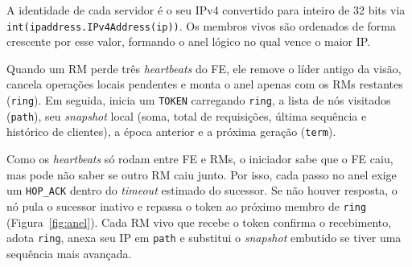 \documentclass[12pt]{article}
\begin{document}
A identidade de cada servidor é o seu IPv4 convertido para inteiro de 32 bits via \texttt{int(ipaddress.\allowbreak IPv4Address(ip))}. Os membros vivos são ordenados de forma crescente por esse valor, formando o anel lógico no qual vence o maior IP.

Quando um RM perde três \textit{heartbeats} do FE, ele remove o líder antigo da visão, cancela operações locais pendentes e monta o anel apenas com os RMs restantes (\texttt{ring}). Em seguida, inicia um \texttt{TOKEN} carregando \texttt{ring}, a lista de nós visitados (\texttt{path}), seu \textit{snapshot} local (soma, total de requisições, última sequência e histórico de clientes), a época anterior e a próxima geração (\texttt{term}).

Como os \textit{heartbeats} só rodam entre FE e RMs, o iniciador sabe que o FE caiu, mas pode não saber se outro RM caiu junto. Por isso, cada passo no anel exige um \texttt{HOP\_ACK} dentro do \textit{timeout} estimado do sucessor. Se não houver resposta, o nó pula o sucessor inativo e repassa o token ao próximo membro de \texttt{ring} (Figura~\ref{fig:anel}). Cada RM vivo que recebe o token confirma o recebimento, adota \texttt{ring}, anexa seu IP em \texttt{path} e substitui o \textit{snapshot} embutido se tiver uma sequência mais avançada.
\end{document}
